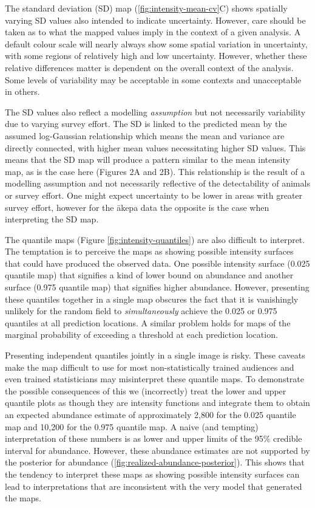 \documentclass{stylefile16/statsoc}
\newcommand{\akepa}{\textquotesingle\={a}kepa}  %
\begin{document}
The standard deviation (SD) map (\autoref{fig:intensity-mean-cv}C) shows spatially varying SD values also intended to indicate uncertainty.  However, care should be taken as to what the mapped values imply in the context of a given analysis.  A default colour scale will nearly always show some spatial variation in uncertainty, with some regions of relatively high and low uncertainty.  However, whether these relative differences matter is dependent on the overall context of the analysis.  Some levels of variability may be acceptable in some contexts and unacceptable in others.

The SD values also reflect a modelling \textit{assumption} but not necessarily variability due to varying survey effort.  The SD is linked to the predicted mean by the assumed log-Gaussian relationship which means the mean and variance are directly connected, with higher mean values necessitating higher SD values.  This means that the SD map will produce a pattern similar to the mean intensity map, as is the case here (Figures 2A and 2B).  This relationship is the result of a modelling assumption and not necessarily reflective of the detectability of animals or survey effort.  One might expect uncertainty to be lower in areas with greater survey effort, however for the \akepa{} data the opposite is the case when interpreting the SD map.

The quantile maps (Figure \ref{fig:intensity-quantiles}) are also difficult to interpret. The temptation is to perceive the maps as showing possible intensity surfaces that could have produced the observed data. One possible intensity surface (0.025 quantile map) that signifies a kind of lower bound on abundance and another surface (0.975 quantile map) that signifies higher abundance.  However, presenting these quantiles together in a single map obscures the fact that it is vanishingly unlikely for the random field to \textit{simultaneously} achieve the 0.025 or 0.975 quantiles at all prediction locations.  A similar problem holds for maps of the marginal probability of exceeding a threshold at each prediction location.  

Presenting independent quantiles jointly in a single image is risky.  These caveats make the map difficult to use for most non-statistically trained audiences and even trained statisticians may misinterpret these quantile maps.  To demonstrate the possible consequences of this we (incorrectly) treat the lower and upper quantile plots as though they are intensity functions and integrate them to obtain an expected abundance estimate of approximately 2,800 for the 0.025 quantile map and 10,200 for the 0.975 quantile map.  A naive (and tempting) interpretation of these numbers is as lower and upper limits of the 95\% credible interval for abundance. However, these abundance estimates are not supported by the posterior for abundance (\autoref{fig:realized-abundance-posterior}).  This shows that the tendency to interpret these maps as showing possible intensity surfaces can lead to interpretations that are inconsistent with the very model that generated the maps.
\end{document}
